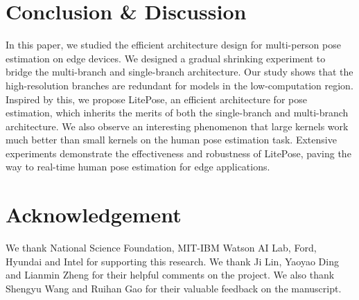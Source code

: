 \documentclass[10pt,twocolumn,letterpaper]{article}
\begin{document}
 \section{Conclusion \& Discussion}

In this paper, we studied the efficient architecture design for multi-person pose estimation on edge devices. We designed a gradual shrinking experiment to bridge the multi-branch and single-branch architecture. Our study shows that the high-resolution branches are redundant for models in the low-computation region. Inspired by this, we propose LitePose, an efficient architecture for pose estimation, which inherits the merits of both the single-branch and multi-branch architecture. We also observe an interesting phenomenon that large kernels work much better than small kernels on the human pose estimation task. Extensive experiments demonstrate the effectiveness and robustness of LitePose, paving the way to real-time human pose estimation for edge applications.

%
 \section*{Acknowledgement}
We thank National Science Foundation, MIT-IBM Watson AI Lab, Ford, Hyundai and Intel for supporting this research. We thank Ji Lin, Yaoyao Ding and Lianmin Zheng for their helpful comments on the project. We also thank Shengyu Wang and Ruihan Gao for their valuable feedback on the manuscript.







 
\end{document}

